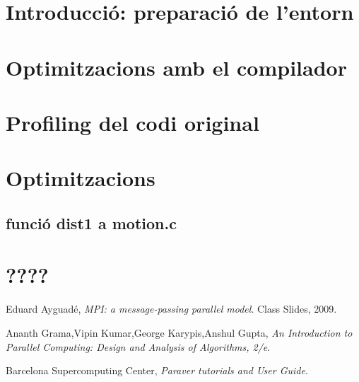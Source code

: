 \documentclass[final,a4paper,11pt]{report}
\begin{document}


\tableofcontents
\newpage


\section{Introducció: preparació de l'entorn}

\section{Optimitzacions amb el compilador}

\section{Profiling del codi original}


\section{Optimitzacions}

\subsection{funció dist1 a motion.c}


\section{????}

\begin{thebibliography}{9}

  Eduard Ayguadé,
  \emph{MPI: a message-passing parallel model}.
  Class Slides,
  2009.

  Ananth Grama,Vipin Kumar,George Karypis,Anshul Gupta,
  \emph{An Introduction to Parallel Computing: Design and Analysis of Algorithms, 2/e}.

  Barcelona Supercomputing Center,
  \emph{Paraver tutorials and User Guide}.

\end{thebibliography}
\end{document}
